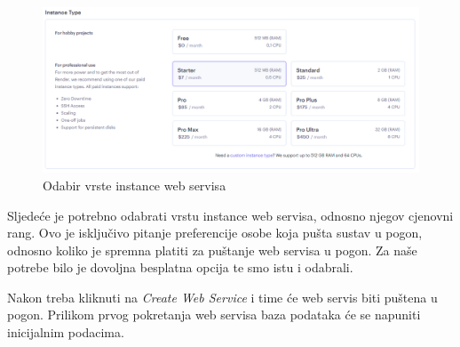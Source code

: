 			\begin{figure}[H]
				\includegraphics[width=\textwidth]{slike/upute/webServisPlacanje.png} %
				\caption{Odabir vrste instance web servisa}
				\label{fig:webServisPlacanje} %
			\end{figure}
			
			Sljedeće je potrebno odabrati vrstu instance web servisa, odnosno njegov cjenovni rang. Ovo je isključivo pitanje preferencije osobe koja pušta sustav u pogon, odnosno koliko je spremna platiti za puštanje web servisa u pogon. Za naše potrebe bilo je dovoljna besplatna opcija te smo istu i odabrali.
			
			Nakon treba kliknuti na \textit{Create Web Service} i time će web servis biti puštena u pogon. Prilikom prvog pokretanja web servisa baza podataka će se napuniti inicijalnim podacima.
			
